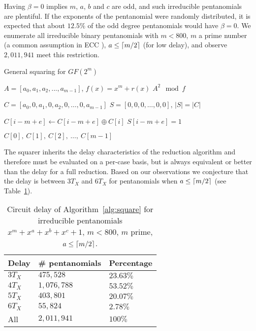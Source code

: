 Having $\beta=0$ implies $m$, $a$, $b$ and $c$ are odd, and such irreducible pentanomials are plentiful. If the exponents of the pentanomial were randomly distributed, it is expected that about $12.5\%$ of the odd degree pentanomials would have $\beta=0$. We enumerate all irreducible binary pentanomials with $m < 800$, $m$ a prime number (a common assumption in ECC \cite{doche2005redundant}), $a \leq \lceil m/2\rceil$ (for low delay), and observe $2,011,941$ meet this restriction. \\

\begin{algorithm}
\caption{General squaring for $GF(2^m)$}
\label{alg:square}
\begin{algorithmic}[1]
\REQUIRE $A = [a_0, a_1, a_2, ..., a_{m-1}]$, $f(x) = x^m + r(x)$
\ENSURE $A^2 \mod f$

\STATE $C = [a_0, 0, a_1, 0, a_2, 0, \ldots, 0, a_{m-1}]$ 
\STATE $S = [0, 0, 0, \ldots, 0, 0]$, $|S| = |C|$

         
    \ELSE
                 
            \ELSE
                \STATE $C[i-m+e] \leftarrow C[i-m+e] \oplus C[i]$ 
            \ENDIF
            \STATE $S[i-m+e] = 1$
        \ENDFOR
    \ENDIF
\ENDFOR

\RETURN $C[0],~C[1],~C[2],~\ldots,~C[m-1]$
\end{algorithmic}
\end{algorithm}

The squarer inherits the delay characteristics of the reduction algorithm and therefore must be evaluated on a per-case basis, but is always equivalent or better than the delay for a full reduction. Based on our observations we conjecture that the delay is between $3 T_X$ and $6 T_X$ for pentanomials when $a \leq \lceil m/2\rceil$ (see Table~\ref{table:square:delays}). \\

\begin{table}
\centering
\caption{Circuit delay of Algorithm~\ref{alg:square} for irreducible pentanomials $x^m + x^a + x^b + x^c + 1$, $m < 800$, $m$ prime, $a \leq \lceil m/2\rceil$.}
{\begin{tabular}{l l l} \label{table:square:delays}
Delay & \# pentanomials & Percentage \\ \hline
$3 T_X$ & $475,528$ & $23.63\%$ \\ \hline
$4 T_X$ & $1,076,788$ & $53.52\%$ \\ \hline
$5 T_X$ & $403,801$ & $20.07\%$ \\ \hline 
$6 T_X$ & $55,824$ & $2.78\%$ \\ \hline
All & $2,011,941$ & $100\%$
\end{tabular}}{}
\end{table}

